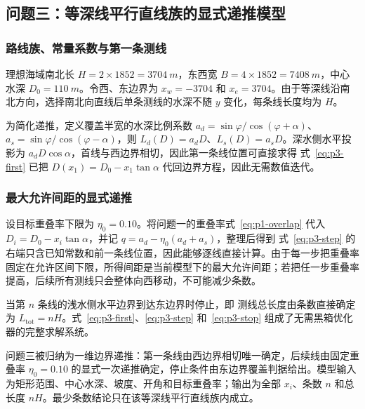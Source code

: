 \subsection{问题三：等深线平行直线族的显式递推模型}
\subsubsection{路线族、常量系数与第一条测线}
理想海域南北长 $H=2\times1852=\SI{3704}{m}$，东西宽 $B=4\times1852=\SI{7408}{m}$，中心水深 $D_0=\SI{110}{m}$。令西、东边界为 $x_w=-3704$ 和 $x_e=3704$。由于等深线沿南北方向，选择南北向直线后单条测线的水深不随 $y$ 变化，每条线长度均为 $H$。

为简化递推，定义覆盖半宽的水深比例系数 $a_d=\sin\varphi/\cos(\varphi+\alpha)$、$a_s=\sin\varphi/\cos(\varphi-\alpha)$，则 $L_d(D)=a_dD$、$L_s(D)=a_sD$。深水侧水平投影为 $a_dD\cos\alpha$，首线与西边界相切，因此第一条线位置可直接求得
式~\eqref{eq:p3-first} 已把 $D(x_1)=D_0-x_1\tan\alpha$ 代回边界方程，因此无需数值迭代。

\subsubsection{最大允许间距的显式递推}
设目标重叠率下限为 $\eta_0=0.10$。将问题一的重叠率式~\eqref{eq:p1-overlap} 代入 $D_i=D_0-x_i\tan\alpha$，并记 $q=a_d-\eta_0(a_d+a_s)$，整理后得到
式~\eqref{eq:p3-step} 的右端只含已知常数和前一条线位置，因此能够逐线直接计算。由于每一步把重叠率固定在允许区间下限，所得间距是当前模型下的最大允许间距；若把任一步重叠率提高，后续所有测线只会整体向西移动，不可能减少条数。

当第 $n$ 条线的浅水侧水平边界到达东边界时停止，即
测线总长度由条数直接确定为 $L_{\mathrm{tot}}=nH$。式~\eqref{eq:p3-first}、\eqref{eq:p3-step} 和~\eqref{eq:p3-stop} 组成了无需黑箱优化器的完整求解系统。

\begin{modelsummary}[问题三模型归纳]
问题三被归纳为一维边界递推：第一条线由西边界相切唯一确定，后续线由固定重叠率 $\eta_0=0.10$ 的显式一次递推确定，停止条件由东边界覆盖判据给出。模型输入为矩形范围、中心水深、坡度、开角和目标重叠率；输出为全部 $x_i$、条数 $n$ 和总长度 $nH$。最少条数结论只在该等深线平行直线族内成立。
\end{modelsummary}

